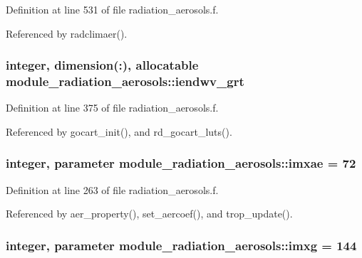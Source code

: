 Definition at line 531 of file radiation\+\_\+aerosols.\+f.



Referenced by radclimaer().

\subsubsection[{\texorpdfstring{iendwv\+\_\+grt}{iendwv_grt}}]{\setlength{\rightskip}{0pt plus 5cm}integer, dimension(\+:), allocatable module\+\_\+radiation\+\_\+aerosols\+::iendwv\+\_\+grt\hspace{0.3cm}{\ttfamily [private]}}\hypertarget{group__module__radiation__aerosols_gac755c4235327053fff060ffa3b2ee2a3}{}\label{group__module__radiation__aerosols_gac755c4235327053fff060ffa3b2ee2a3}


Definition at line 375 of file radiation\+\_\+aerosols.\+f.



Referenced by gocart\+\_\+init(), and rd\+\_\+gocart\+\_\+luts().

\subsubsection[{\texorpdfstring{imxae}{imxae}}]{\setlength{\rightskip}{0pt plus 5cm}integer, parameter module\+\_\+radiation\+\_\+aerosols\+::imxae = 72\hspace{0.3cm}{\ttfamily [private]}}\hypertarget{group__module__radiation__aerosols_ga52cda855a397136f75768d205292ddbb}{}\label{group__module__radiation__aerosols_ga52cda855a397136f75768d205292ddbb}


Definition at line 263 of file radiation\+\_\+aerosols.\+f.



Referenced by aer\+\_\+property(), set\+\_\+aercoef(), and trop\+\_\+update().

\subsubsection[{\texorpdfstring{imxg}{imxg}}]{\setlength{\rightskip}{0pt plus 5cm}integer, parameter module\+\_\+radiation\+\_\+aerosols\+::imxg = 144\hspace{0.3cm}{\ttfamily [private]}}\hypertarget{group__module__radiation__aerosols_gaa7b2e0e1d0669af4efc75cb32301f1f1}{}\label{group__module__radiation__aerosols_gaa7b2e0e1d0669af4efc75cb32301f1f1}


